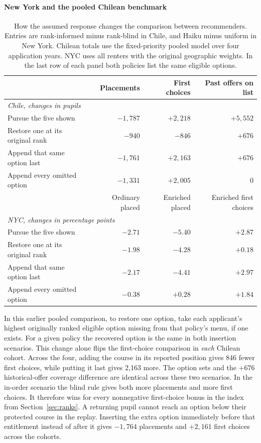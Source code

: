 \paragraph{New York and the pooled Chilean benchmark}
\begin{table}[ht]\centering\small
\caption{How the assumed response changes the comparison between recommenders. Entries are rank-informed minus rank-blind in Chile, and Haiku minus uniform in New York. Chilean totals use the fixed-priority pooled model over four application years. NYC uses all renters with the original geographic weights. In the last row of each panel both policies list the same eligible options.}\label{tab:response}
\begin{tabular}{@{}lrrr@{}}\toprule
 & Placements & First choices & Past offers on list\\\midrule
\multicolumn{4}{l}{\textit{Chile, changes in pupils}}\\
Pursue the five shown & $-1,787$ & $+2,218$ & $+5,552$\\
Restore one at its original rank & $-940$ & $-846$ & $+676$\\
Append that same option last & $-1,761$ & $+2,163$ & $+676$\\
Append every omitted option & $-1,331$ & $+2,005$ & $0$\\\midrule
 & Ordinary placed & Enriched placed & Enriched first choices\\\midrule
\multicolumn{4}{l}{\textit{NYC, changes in percentage points}}\\
Pursue the five shown & $-2.71$ & $-5.40$ & $+2.87$\\
Restore one at its original rank & $-1.98$ & $-4.28$ & $+0.18$\\
Append that same option last & $-2.17$ & $-4.41$ & $+2.97$\\
Append every omitted option & $-0.38$ & $+0.28$ & $+1.84$\\\bottomrule
\end{tabular}
\end{table}

In this earlier pooled comparison, to restore one option, take each applicant's highest originally ranked eligible option missing from that policy's menu, if one exists. For a given policy the recovered option is the same in both insertion scenarios. This change alone flips the first-choice comparison in \emph{each} Chilean cohort. Across the four, adding the course in its reported position gives 846 fewer first choices, while putting it last gives 2,163 more. The option sets and the $+676$ historical-offer coverage difference are identical across these two scenarios. In the in-order scenario the blind rule gives both more placements and more first choices. It therefore wins for every nonnegative first-choice bonus in the index from Section~\ref{sec:ranks}. A returning pupil cannot reach an option below their protected course in the replay. Inserting the extra option immediately before that entitlement instead of after it gives $-1,764$ placements and $+2,161$ first choices across the cohorts.

